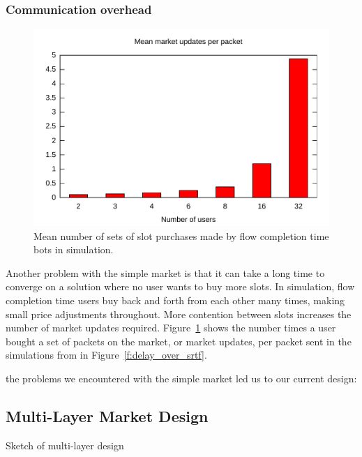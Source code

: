 \subsubsection{Communication overhead}

\begin{figure}
\includegraphics[width=\columnwidth]{plots/num_market_updates.pdf}
\caption{Mean number of sets of slot purchases made by flow completion time bots in simulation.}
\label{f:num_market_updates}
\end{figure}

Another problem with the simple market is that it can take a long time to converge on a solution where no user wants to buy more slots. In simulation, flow completion time users buy back and forth from each other many times, making small price adjustments throughout. More contention between slots increases the number of market updates required. 
Figure~\ref{f:num_market_updates} shows the number times a user bought a set of packets on the market, or market updates, per packet sent in the simulations from in Figure~\ref{f:delay_over_srtf}.

the problems we encountered with the simple market led us to our current design:
\subsection{Multi-Layer Market Design}

Sketch of multi-layer design
